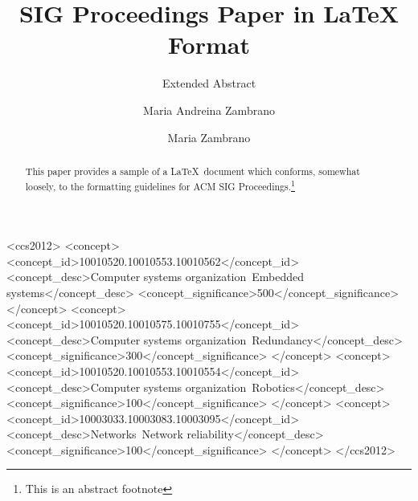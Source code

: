 \documentclass[10pt,sigconf]{acmart}
\begin{document}
\title{SIG Proceedings Paper in LaTeX Format}
\subtitle{Extended Abstract}

\author{Maria Andreina Zambrano}


\author{Maria Zambrano}




\renewcommand{\shortauthors}{F. Lastname et al.}


\begin{abstract}
This paper provides a sample of a \LaTeX\ document which conforms,
somewhat loosely, to the formatting guidelines for
ACM SIG Proceedings.\footnote{This is an abstract footnote}
\end{abstract}

%
%
\begin{CCSXML}
<ccs2012>
 <concept>
  <concept_id>10010520.10010553.10010562</concept_id>
  <concept_desc>Computer systems organization~Embedded systems</concept_desc>
  <concept_significance>500</concept_significance>
 </concept>
 <concept>
  <concept_id>10010520.10010575.10010755</concept_id>
  <concept_desc>Computer systems organization~Redundancy</concept_desc>
  <concept_significance>300</concept_significance>
 </concept>
 <concept>
  <concept_id>10010520.10010553.10010554</concept_id>
  <concept_desc>Computer systems organization~Robotics</concept_desc>
  <concept_significance>100</concept_significance>
 </concept>
 <concept>
  <concept_id>10003033.10003083.10003095</concept_id>
  <concept_desc>Networks~Network reliability</concept_desc>
  <concept_significance>100</concept_significance>
 </concept>
</ccs2012>  
\end{CCSXML}



\end{document}
